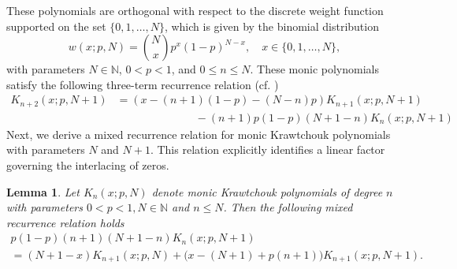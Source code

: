 \documentclass[final,3p,times,12pt]{elsarticle}
\newtheorem{lemma}{Lemma}[section]
\numberwithin{equation}{section}  %
\begin{document}
These polynomials are orthogonal with respect to the discrete weight function supported on the set $\{0, 1, \dots, N\}$, which is given by the binomial distribution
\begin{equation}\label{Weightfunction-Krawtchouk}
	w(x;p,N) = \binom{N}{x} p^x (1-p)^{N-x}, \quad x \in \{0, 1, \dots, N\},
\end{equation}
with parameters $N \in \mathbb{N}$, $0 < p < 1$, and $0 \leq n \leq N$.
These monic polynomials satisfy the following three-term recurrence relation (cf. \cite[page 237]{Koekoek-Book-HypergeometricOP})
\begin{align} \label{Monic-Krawtchouk-:ttrr}
	\nonumber	K_{n+2}(x;p, N+1) &= (x - (n+1)(1-p) -(N-n)p) K_{n+1}(x; p,N+1) \\
	&\hspace{3cm}- (n+1)p(1-p)(N+1-n) K_n(x; p,N+1)
\end{align}
Next, we derive a mixed recurrence relation for monic Krawtchouk polynomials with parameters $N$ and $N+1$. This relation explicitly identifies a linear factor governing the interlacing of zeros. 

\begin{lemma}
	Let $K_n(x; p, N)$ denote monic Krawtchouk polynomials of degree $n$ with parameters $0 < p < 1, N\in \mathbb{N}$ and $n\leq N$. Then the  following mixed recurrence relation holds	\begin{multline}\label{Mixed-TTRR-linear-factor-interlacing-Krawtchouk-n(N+1)-(n+1)N}
		p(1-p)(n+1)(N+1-n)K_n(x; p, N+1) \\
		= (N+1-x)K_{n+1}(x; p, N) + \Big(x - (N+1) + p(n+1)\Big)K_{n+1}(x; p, N+1).
	\end{multline}
\end{lemma}
\end{document}
